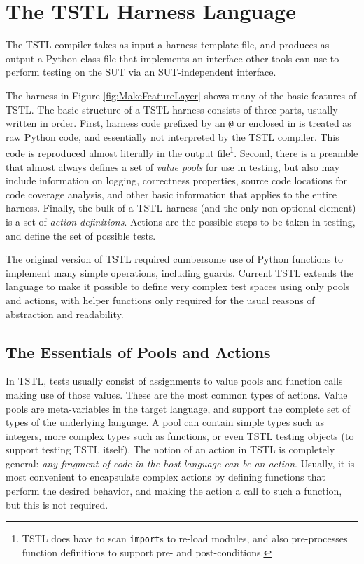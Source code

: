 \section{The TSTL Harness Language}
\label{sec:lang}

The TSTL compiler takes as input a harness template file, and produces
as output a Python class file that implements an interface other tools
can use to perform testing on the SUT via an SUT-independent interface.

The harness in Figure \ref{fig:MakeFeatureLayer} shows many of the
basic features of TSTL.  The basic structure of a TSTL harness
consists of three parts, usually written in order.  First, harness
code prefixed by an {\tt @} or enclosed in {\tt <@ @>} is treated as
raw Python code, and essentially not interpreted by the TSTL
compiler.  This code is reproduced almost literally in the output
file\footnote{TSTL does have to scan {\tt import}s to re-load modules, and also pre-processes function
  definitions to support
pre- and post-conditions.}.  Second, there is a preamble that almost
always defines a set of \emph{value pools} for use in testing, but
also may include information on logging, correctness properties,
source code locations for code coverage analysis, and other basic
information that applies to the entire harness.  Finally, the bulk of
a TSTL harness (and the only non-optional element) is a set of
\emph{action definitions}.  Actions are the possible steps to be taken in
testing, and define the set of possible tests.

The original version of TSTL \cite{NFM15} required cumbersome use of Python
functions to implement many simple operations, including guards.  Current TSTL extends
the language to make it possible to define very complex test spaces
using only pools and actions, with helper functions only required for
the usual reasons of abstraction and readability.

\subsection{The Essentials of Pools and Actions}

In TSTL, tests usually consist of assignments to value pools and
function calls making use of those values.  These are the most common
types of actions.  Value pools are
meta-variables in the target language, and support the complete set of
types of the underlying language.  A pool can contain simple types
such as integers, more complex types such as functions, or even TSTL
testing objects (to support testing TSTL itself).    The notion of an action in TSTL is
completely general:  \emph{any fragment of code in the host language can be
an action}.  Usually, it is most convenient to encapsulate complex
actions by defining functions that perform the desired behavior, and
making the action a call to such a function, but this is not required.

